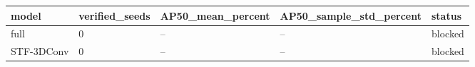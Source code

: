 \begin{tabular}{lllll}
\hline
model & verified\_seeds & AP50\_mean\_percent & AP50\_sample\_std\_percent & status \\
\hline
full & 0 & -- & -- & blocked \\
STF-3DConv & 0 & -- & -- & blocked \\
\hline
\end{tabular}
